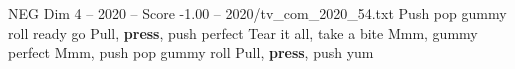 \begin{textsample}{NEG Dim 4 – 2020 – Score -1.00 – 2020/tv\_com\_2020\_54.txt}  \label{ex:f4_neg_064}
Push pop gummy roll ready go Pull, \textbf{press}, push perfect Tear it all, take a bite Mmm, gummy perfect Mmm, push pop gummy roll Pull, \textbf{press}, push yum

\end{textsample}
